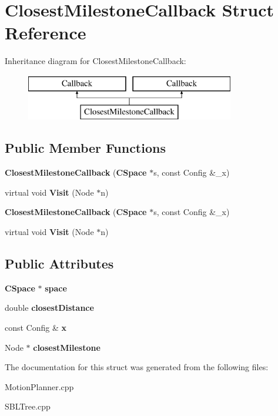\section{Closest\+Milestone\+Callback Struct Reference}
\label{structClosestMilestoneCallback}
Inheritance diagram for Closest\+Milestone\+Callback\+:\begin{figure}[H]
\begin{center}
\leavevmode
\includegraphics[height=2.000000cm]{structClosestMilestoneCallback}
\end{center}
\end{figure}
\subsection*{Public Member Functions}
\begin{DoxyCompactItemize}
\item 
{\bfseries Closest\+Milestone\+Callback} ({\bf C\+Space} $\ast$s, const Config \&\+\_\+x)\label{structClosestMilestoneCallback_a9f8a444162aa5e03a35e3bb99bf3d4c7}

\item 
virtual void {\bfseries Visit} (Node $\ast$n)\label{structClosestMilestoneCallback_a5bb6282621e11ea803b390ed166a4080}

\item 
{\bfseries Closest\+Milestone\+Callback} ({\bf C\+Space} $\ast$s, const Config \&\+\_\+x)\label{structClosestMilestoneCallback_a9f8a444162aa5e03a35e3bb99bf3d4c7}

\item 
virtual void {\bfseries Visit} (Node $\ast$n)\label{structClosestMilestoneCallback_a5bb6282621e11ea803b390ed166a4080}

\end{DoxyCompactItemize}
\subsection*{Public Attributes}
\begin{DoxyCompactItemize}
\item 
{\bf C\+Space} $\ast$ {\bfseries space}\label{structClosestMilestoneCallback_a0e13d5e2ef219036d553c202c697e6af}

\item 
double {\bfseries closest\+Distance}\label{structClosestMilestoneCallback_af7e5f01ea89c7f6a277c131ed38c3860}

\item 
const Config \& {\bfseries x}\label{structClosestMilestoneCallback_a9884a058f0b28f7934f1b1171c8f123d}

\item 
Node $\ast$ {\bfseries closest\+Milestone}\label{structClosestMilestoneCallback_aef76406c3da34e2ed667fae66bbdba22}

\end{DoxyCompactItemize}


The documentation for this struct was generated from the following files\+:\begin{DoxyCompactItemize}
\item 
Motion\+Planner.\+cpp\item 
S\+B\+L\+Tree.\+cpp\end{DoxyCompactItemize}
